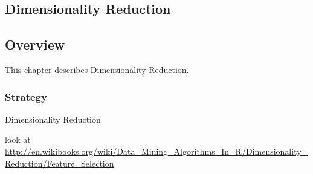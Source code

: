 


\renewcommand{\bibsection}{\subsection{\bibname}}
\begin{bibunit}

\chapter{Dimensionality Reduction}
\label{ch:dimension}

\section{Overview}
This chapter describes Dimensionality Reduction.


\subsection{Strategy}

Dimensionality Reduction

look at \url{http://en.wikibooks.org/wiki/Data_Mining_Algorithms_In_R/Dimensionality_Reduction/Feature_Selection}



\end{bibunit}
